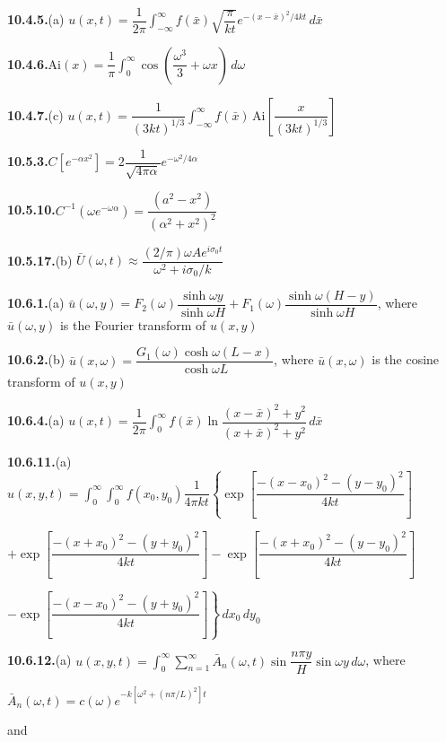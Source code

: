 \medskip
\textbf{10.4.5.}\quad (a) $u(x,t) = \dfrac{1}{2\pi}\int_{-\infty}^{\infty}f(\bar{x})\sqrt{\dfrac{\pi}{kt}}e^{-(x-\bar{x})^2/4kt}\,d\bar{x}$%

\medskip
\textbf{10.4.6.}\quad $\text{Ai}(x) = \dfrac{1}{\pi}\int_0^{\infty}\cos\left(\dfrac{\omega^3}{3}+\omega x\right)\,d\omega$

\medskip
\textbf{10.4.7.}\quad (c) $u(x,t) = \dfrac{1}{(3kt)^{1/3}}\int_{-\infty}^{\infty}f(\bar{x})\,\text{Ai}\!\left[\dfrac{x}{(3kt)^{1/3}}\right]$%

\medskip
\textbf{10.5.3.}\quad $C[e^{-\alpha x^2}] = 2\dfrac{1}{\sqrt{4\pi\alpha}}e^{-\omega^2/4\alpha}$

\medskip
\textbf{10.5.10.}\quad $C^{-1}(\omega e^{-\omega\alpha}) = \dfrac{(a^2-x^2)}{(\alpha^2+x^2)^2}$%

\medskip
\textbf{10.5.17.}\quad (b) $\bar{U}(\omega,t) \approx \dfrac{(2/\pi)\omega A e^{i\sigma_0 t}}{\omega^2+i\sigma_0/k}$

\medskip
\textbf{10.6.1.}\quad (a) $\bar{u}(\omega,y) = F_2(\omega)\dfrac{\sinh\omega y}{\sinh\omega H} + F_1(\omega)\dfrac{\sinh\omega(H-y)}{\sinh\omega H}$, where $\bar{u}(\omega,y)$ is the Fourier transform of $u(x,y)$

\medskip
\textbf{10.6.2.}\quad (b) $\bar{u}(x,\omega) = \dfrac{G_1(\omega)\cosh\omega(L-x)}{\cosh\omega L}$, where $\bar{u}(x,\omega)$ is the cosine transform of $u(x,y)$

\medskip
\textbf{10.6.4.}\quad (a) $u(x,t) = \dfrac{1}{2\pi}\int_0^{\infty}f(\bar{x})\ln\dfrac{(x-\bar{x})^2+y^2}{(x+\bar{x})^2+y^2}\,d\bar{x}$%

\medskip
\textbf{10.6.11.}\quad (a) $u(x,y,t) = \int_0^{\infty}\int_0^{\infty}f(x_0,y_0)\dfrac{1}{4\pi kt}\left\{\exp\left[\dfrac{-(x-x_0)^2-(y-y_0)^2}{4kt}\right]\right.$

$\left.+\exp\left[\dfrac{-(x+x_0)^2-(y+y_0)^2}{4kt}\right] - \exp\left[\dfrac{-(x+x_0)^2-(y-y_0)^2}{4kt}\right]\right.$

$\left.-\exp\left[\dfrac{-(x-x_0)^2-(y+y_0)^2}{4kt}\right]\right\}\,dx_0\,dy_0$

\medskip
\textbf{10.6.12.}\quad (a) $u(x,y,t) = \int_0^{\infty}\sum_{n=1}^{\infty}\bar{A}_n(\omega,t)\sin\dfrac{n\pi y}{H}\sin\omega y\,d\omega$, where

$\bar{A}_n(\omega,t) = c(\omega)e^{-k[\omega^2+(n\pi/L)^2]t}$

and

